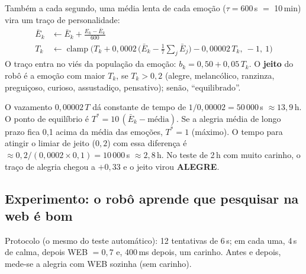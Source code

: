 \documentclass[11pt,a4paper]{article}
\begin{document}
Também a cada segundo, uma média lenta de cada emoção ($\tau = 600$\,s $=$ 10\,min) vira um traço de personalidade:
\begin{align}
\bar E_k &\leftarrow \bar E_k + \frac{E_k - \bar E_k}{600} \\
T_k &\leftarrow \operatorname{clamp}\Big(T_k + 0{,}0002\,\big(\bar E_k - \tfrac17\textstyle\sum_j \bar E_j\big) - 0{,}00002\,T_k,\ -1,\ 1\Big)
\end{align}
O traço entra no viés da população da emoção: $b_k = 0{,}50 + 0{,}05\,T_k$. O \textbf{jeito} do robô é a emoção com maior $T_k$, se
$T_k > 0{,}2$ (alegre, melancólico, ranzinza, preguiçoso, curioso, assustadiço, pensativo); senão, “equilibrado”.

\begin{exemplo}
O vazamento $0{,}00002\,T$ dá constante de tempo de $1/0{,}00002 = 50\,000$\,s $\approx 13{,}9$\,h. O ponto de equilíbrio é
$T^\ast = 10\,(\bar E_k - \text{média})$. Se a alegria média de longo prazo fica 0,1 acima da média das emoções, $T^\ast = 1$ (máximo).
O tempo para atingir o limiar de jeito ($0{,}2$) com essa diferença é $\approx 0{,}2/(0{,}0002\times0{,}1) = 10\,000$\,s $\approx 2{,}8$\,h.
No teste de 2\,h com muito carinho, o traço de alegria chegou a $+0{,}33$ e o jeito virou \textbf{ALEGRE}.
\end{exemplo}

\subsection{Experimento: o robô aprende que pesquisar na web é bom}\label{sec:experimento}

Protocolo (o mesmo do teste automático): 12 tentativas de 6\,s; em cada uma, 4\,s de calma, depois WEB $=0{,}7$ e, 400\,ms depois,
um carinho. Antes e depois, mede-se a alegria com WEB sozinha (sem carinho).
\end{document}
